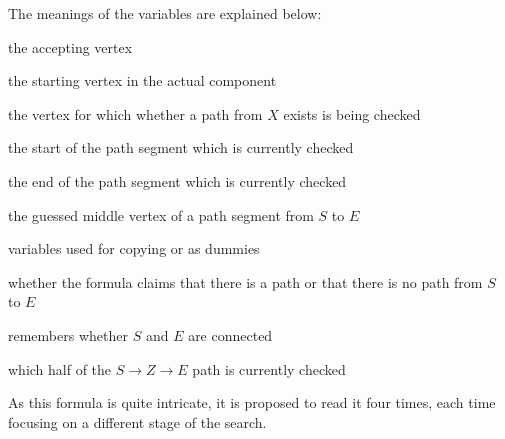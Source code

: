 The meanings of the variables are explained below:
\begin{description}
    \setlength\itemsep{0.15em}
    \item[$Y$:] the accepting vertex
    \item[$X$:] the starting vertex in the actual component
    \item[$I$:] the vertex for which whether a path from $X$ exists is being checked
    \item[$S$:] the start of the path segment which is currently checked
    \item[$E$:] the end of the path segment  which is currently checked
    \item[$Z, Z_{e}$:] the guessed middle vertex of a path segment from $S$ to $E$
    \item[$A, B, b_{0}$:] variables used for copying or as dummies
    \item[$b_{path}$:] whether the formula claims that there is a path or that there is no path from $S$ to $E$
    \item[$b_{1}$:] remembers whether $S$ and $E$ are connected
    \item[$b_{2}, b_{2e}$:] which half of the $S \to Z \to E$ path is currently checked
\end{description}
As this formula is quite intricate, it is proposed to read it four times, each time focusing on a different stage of the search.
